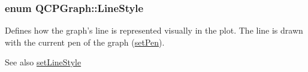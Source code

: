 \hypertarget{classQCPGraph_ad60175cd9b5cac937c5ee685c32c0859}{
\subsubsection[{\-Line\-Style}]{\setlength{\rightskip}{0pt plus 5cm}enum {\bf \-Q\-C\-P\-Graph\-::\-Line\-Style}}}\label{classQCPGraph_ad60175cd9b5cac937c5ee685c32c0859}
\-Defines how the graph's line is represented visually in the plot. \-The line is drawn with the current pen of the graph (\hyperlink{classQCPAbstractPlottable_ab74b09ae4c0e7e13142fe4b5bf46cac7}{set\-Pen}). \begin{DoxySeeAlso}{\-See also}
\hyperlink{classQCPGraph_a513fecccff5b2a50ce53f665338c60ff}{set\-Line\-Style} 
\end{DoxySeeAlso}
